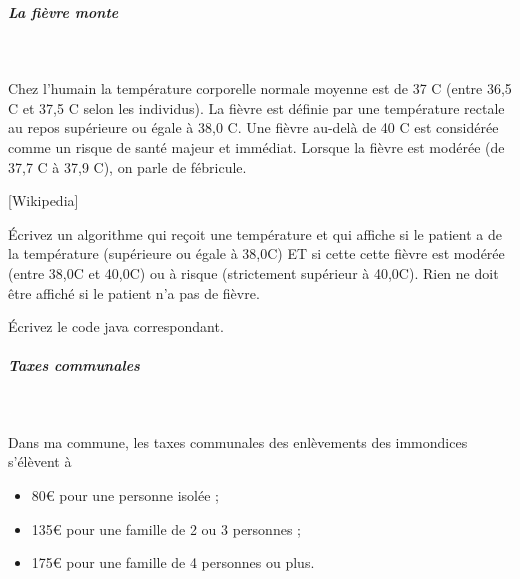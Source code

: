\documentclass[11pt,a4paper]{article}
\begin{document}
            \par
        
			
		\subparagraph{La fi\`evre monte} 
		
					\textcolor{white}{.} \par
				
          Chez l'humain la temp\'erature corporelle normale moyenne est de 37 \textdegree C (entre 36,5 \textdegree C et 37,5 \textdegree C selon les individus). 
          La fi\`evre est d\'efinie par une temp\'erature rectale au repos sup\'erieure ou \'egale \`a 38,0 \textdegree C. 
          Une fi\`evre au-del\`a de 40 \textdegree C  est consid\'er\'ee comme un risque de sant\'e majeur et imm\'ediat. 
          Lorsque la fi\`evre est mod\'er\'ee (de 37,7 \textdegree C \`a 37,9 \textdegree C), on parle de f\'ebricule.\par
				
          [Wikipedia]
        
            \par
        
          \'Ecrivez un algorithme  qui re\c coit une temp\'erature et qui affiche si le patient a de la
          temp\'erature (sup\'erieure ou \'egale \`a 38,0\textdegree C) ET si cette cette fi\`evre est mod\'er\'ee (entre 38,0\textdegree C 
          et 40,0\textdegree C) ou \`a risque (strictement sup\'erieur \`a 40,0\textdegree C). 
          Rien ne doit \^etre affich\'e si le patient n'a pas de fi\`evre.
        
            \par
        \'Ecrivez le code java correspondant.
            \par
        
			
		\subparagraph{Taxes communales} 
		
					\textcolor{white}{.} \par
				
          Dans ma commune, les taxes communales des enl\`evements des immondices s'\'el\`event \`a
          
					\begin{itemize}
				
			\item 80€ pour une personne isol\'ee ;
			\item 135€ pour une famille de 2 ou 3 personnes ;
			\item 175€ pour une famille de 4 personnes ou plus.
					\end{itemize}
				
\end{document}
